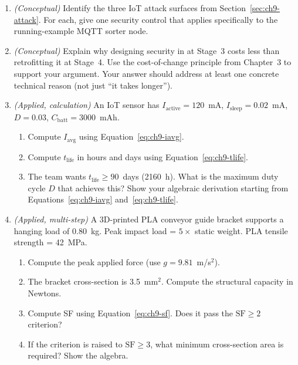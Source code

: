 \begin{enumerate}
  \item[Q1.] \textit{(Conceptual)} Identify the three IoT attack surfaces from
             Section~\ref{sec:ch9-attack}.
             For each, give one security control that applies specifically to
             the running-example MQTT sorter node.

  \item[Q2.] \textit{(Conceptual)} Explain why designing security in at Stage~3
             costs less than retrofitting it at Stage~4.
             Use the cost-of-change principle from Chapter~3 to support your
             argument.
             Your answer should address at least one concrete technical reason
             (not just ``it takes longer'').

  \item[Q3.] \textit{(Applied, calculation)} An IoT sensor has
             $I_{\text{active}} = 120$~mA, $I_{\text{sleep}} = 0.02$~mA,
             $D = 0.03$, $C_{\text{batt}} = 3000$~mAh.
             \begin{enumerate}
               \item[(a)] Compute $I_{\text{avg}}$ using
                          Equation~\ref{eq:ch9-iavg}.
               \item[(b)] Compute $t_{\text{life}}$ in hours and days using
                          Equation~\ref{eq:ch9-tlife}.
               \item[(c)] The team wants $t_{\text{life}} \geq 90$~days
                          (2160~h).
                          What is the maximum duty cycle $D$ that achieves this?
                          Show your algebraic derivation starting from
                          Equations~\ref{eq:ch9-iavg} and~\ref{eq:ch9-tlife}.
             \end{enumerate}

  \item[Q4.] \textit{(Applied, multi-step)} A 3D-printed PLA conveyor guide
             bracket supports a hanging load of 0.80~kg.
             Peak impact load = $5\times$ static weight.
             PLA tensile strength = 42~MPa.
             \begin{enumerate}
               \item[(a)] Compute the peak applied force (use
                          $g = 9.81$~m/s$^2$).
               \item[(b)] The bracket cross-section is 3.5~mm$^2$.
                          Compute the structural capacity in Newtons.
               \item[(c)] Compute SF using Equation~\ref{eq:ch9-sf}.
                          Does it pass the $\mathrm{SF} \geq 2$ criterion?
               \item[(d)] If the criterion is raised to $\mathrm{SF} \geq 3$,
                          what minimum cross-section area is required?
                          Show the algebra.
             \end{enumerate}


\end{enumerate}

